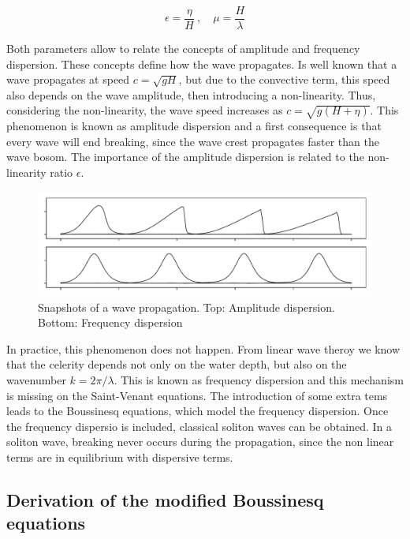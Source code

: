 \begin{equation}
    \epsilon = \frac{\eta}{H} \ ,\quad \mu = \frac{H}{\lambda}
    \label{nonlin_disp_ratios}
\end{equation}

Both parameters allow to relate the concepts of amplitude and frequency dispersion. These concepts define how the wave propagates. Is well known that a wave propagates at speed $c=\sqrt{gH}$, but due to the convective term, this speed also depends on the wave amplitude, then introducing a non-linearity. Thus, considering the non-linearity, the wave speed increases as $c=\sqrt{g(H+\eta)}$. This phenomenon is known as amplitude dispersion and a first consequence is that every wave will end breaking, since the wave crest propagates faster than the wave bosom. The importance of the amplitude dispersion is related to the non-linearity ratio $\epsilon$.


\begin{figure}
    \centering
    \includegraphics[width=.95\textwidth]{img/eq/boussinesq_dispersion.pdf}
    \caption{Snapshots of a wave propagation. Top: Amplitude dispersion. Bottom: Frequency dispersion}
    \label{boussinesq_dispersion}
\end{figure}


In practice, this phenomenon does not happen. From linear wave theroy we know that the celerity depends not only on the water depth, but also on the wavenumber $k=2\pi/\lambda$. This is known as frequency dispersion and this mechanism is missing on the Saint-Venant equations. The introduction of some extra tems leads to the Boussinesq equations, which model the frequency dispersion. Once the frequency dispersio is included, classical soliton waves can be obtained. In a soliton wave, breaking never occurs during the propagation, since the non linear terms are in equilibrium with dispersive terms.


\subsection{Derivation of the modified Boussinesq equations}

